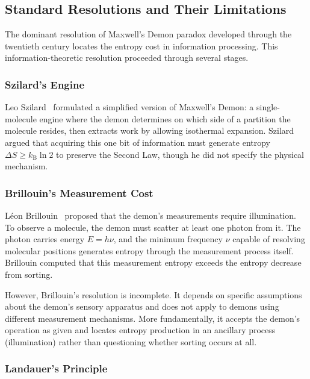 \documentclass[twocolumn,showpacs,preprintnumbers,amsmath,amssymb,prd]{revtex4-2}
\theoremstyle{definition}
\theoremstyle{remark}
\newcommand{\kB}{k_{\mathrm{B}}}
\begin{document}
\subsection{Standard Resolutions and Their Limitations}

The dominant resolution of Maxwell's Demon paradox developed through the twentieth century locates the entropy cost in information processing. This information-theoretic resolution proceeded through several stages.

\subsubsection{Szilard's Engine}

Leo Szilard~\cite{szilard1929entropieverminderung} formulated a simplified version of Maxwell's Demon: a single-molecule engine where the demon determines on which side of a partition the molecule resides, then extracts work by allowing isothermal expansion. Szilard argued that acquiring this one bit of information must generate entropy $\Delta S \geq \kB \ln 2$ to preserve the Second Law, though he did not specify the physical mechanism.

\subsubsection{Brillouin's Measurement Cost}

Léon Brillouin~\cite{brillouin1951maxwells} proposed that the demon's measurements require illumination. To observe a molecule, the demon must scatter at least one photon from it. The photon carries energy $E = h\nu$, and the minimum frequency $\nu$ capable of resolving molecular positions generates entropy through the measurement process itself. Brillouin computed that this measurement entropy exceeds the entropy decrease from sorting.

However, Brillouin's resolution is incomplete. It depends on specific assumptions about the demon's sensory apparatus and does not apply to demons using different measurement mechanisms. More fundamentally, it accepts the demon's operation as given and locates entropy production in an ancillary process (illumination) rather than questioning whether sorting occurs at all.

\subsubsection{Landauer's Principle}
\end{document}
